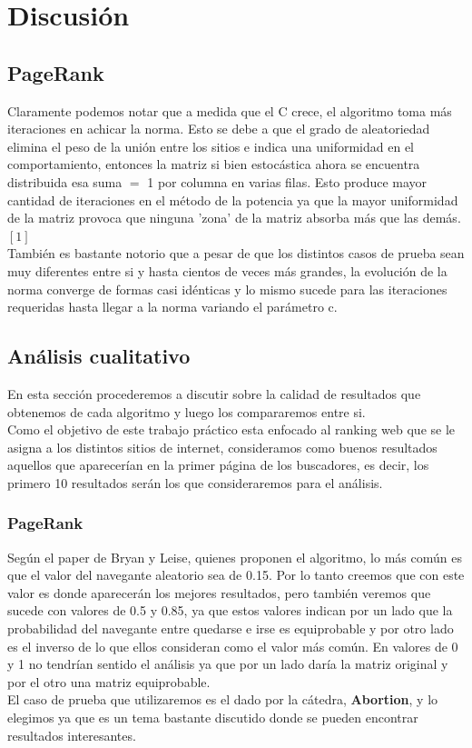 \section{Discusi\'on}

\subsection{PageRank}
Claramente podemos notar que a medida que el C crece, el algoritmo toma más iteraciones en achicar la norma. Esto se debe a que el grado de aleatoriedad elimina el peso de la unión entre los sitios e indica una uniformidad en el comportamiento, entonces la matriz si bien estocástica ahora se encuentra distribuida esa suma $=$ 1 por columna en varias filas. Esto produce mayor cantidad de iteraciones en el método de la potencia ya que la mayor uniformidad de la matriz provoca que ninguna 'zona' de la matriz absorba más que las demás.   $[1]$\\
También es bastante notorio que a pesar de que los distintos casos de prueba sean muy diferentes entre si y hasta cientos de veces más grandes, la evolución de la norma converge de formas casi idénticas y lo mismo sucede para las iteraciones requeridas hasta llegar a la norma variando el parámetro c.

\subsection{Análisis cualitativo}

En esta sección procederemos a discutir sobre la calidad de resultados que obtenemos de cada algoritmo y luego los compararemos entre si.\\
Como el objetivo de este trabajo práctico esta enfocado al ranking web que se le asigna a los distintos sitios de internet, consideramos como buenos resultados aquellos que aparecerían en la primer página de los buscadores, es decir, los primero 10 resultados serán los que consideraremos para el análisis.

\subsubsection{PageRank}
Según el paper de Bryan y Leise, quienes proponen el algoritmo, lo más común es que el valor del navegante aleatorio sea de 0.15. Por lo tanto creemos que con este valor es donde aparecerán los mejores resultados, pero también veremos que sucede con valores de 0.5 y 0.85, ya que estos valores indican por un lado que la probabilidad del navegante entre quedarse e irse es equiprobable y por otro lado es el inverso de lo que ellos consideran como el valor más común. En valores de 0 y 1 no tendrían sentido el análisis ya que por un lado daría la matriz original y por el otro una matriz equiprobable.\\
El caso de prueba que utilizaremos es el dado por la cátedra, \textbf{Abortion}, y lo elegimos ya que es un tema bastante discutido donde se pueden encontrar resultados interesantes.

